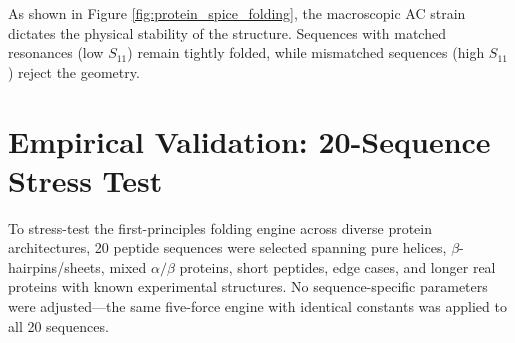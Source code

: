 As shown in Figure \ref{fig:protein_spice_folding}, the macroscopic AC strain dictates the physical stability of the structure. Sequences with matched resonances (low $S_{11}$) remain tightly folded, while mismatched sequences (high $S_{11}$) reject the geometry.

\section{Empirical Validation: 20-Sequence Stress Test}
\label{sec:stress_test}

To stress-test the first-principles folding engine across diverse protein architectures, 20 peptide sequences were selected spanning pure helices, $\beta$-hairpins/sheets, mixed $\alpha/\beta$ proteins, short peptides, edge cases, and longer real proteins with known experimental structures. No sequence-specific parameters were adjusted---the same five-force engine with identical constants was applied to all 20 sequences.

